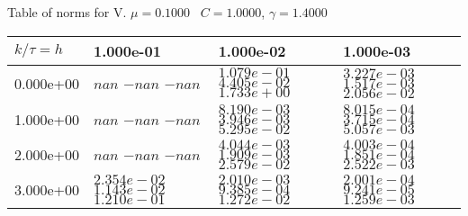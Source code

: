 \begin{center}
Table of norms for V. $\mu = 0.1000$ \, $C = 1.0000$, $\gamma = 1.4000$
  
\begin{tabular}{|p{1in}|p{1in}|p{1in}|p{1in}|} \hline
$k / \tau = h$ &1.000e-01 &1.000e-02 &1.000e-03 \\ \hline 
0.000e+00 & $nan$  $-nan$  $-nan$  & $1.079e-01$  $4.405e-02$  $1.733e+00$  & $3.227e-03$  $1.517e-03$  $2.056e-02$  \\ \hline 
1.000e+00 & $nan$  $-nan$  $-nan$  & $8.190e-03$  $3.946e-03$  $5.295e-02$  & $8.015e-04$  $3.715e-04$  $5.057e-03$  \\ \hline 
2.000e+00 & $nan$  $-nan$  $-nan$  & $4.044e-03$  $1.909e-03$  $2.579e-02$  & $4.003e-04$  $1.851e-04$  $2.522e-03$  \\ \hline 
3.000e+00 & $2.354e-02$  $1.143e-02$  $1.210e-01$  & $2.010e-03$  $9.385e-04$  $1.272e-02$  & $2.001e-04$  $9.241e-05$  $1.259e-03$  \\ \hline 

\end{tabular}\\[20pt]
\end{center}
